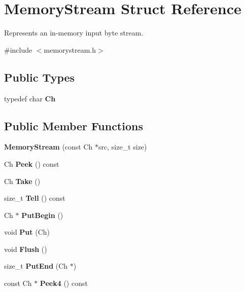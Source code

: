 \hypertarget{a02296}{}\section{Memory\+Stream Struct Reference}
\label{a02296}


Represents an in-\/memory input byte stream.  




{\ttfamily \#include $<$memorystream.\+h$>$}

\subsection*{Public Types}
\begin{DoxyCompactItemize}
\item 
\mbox{\label{a02296_a62a1cbd052c325c83dbdb387d2f89088}} 
typedef char {\bfseries Ch}
\end{DoxyCompactItemize}
\subsection*{Public Member Functions}
\begin{DoxyCompactItemize}
\item 
\mbox{\label{a02296_a2472317ef00fcd44e5cc209e04c49756}} 
{\bfseries Memory\+Stream} (const Ch $\ast$src, size\+\_\+t size)
\item 
\mbox{\label{a02296_a707014bbfd303838b6a7b90be24f6adc}} 
Ch {\bfseries Peek} () const
\item 
\mbox{\label{a02296_a14ff92deda5d39c9b166aaa07e82a0ee}} 
Ch {\bfseries Take} ()
\item 
\mbox{\label{a02296_a2de1486742f0d44decda90a56bc43268}} 
size\+\_\+t {\bfseries Tell} () const
\item 
\mbox{\label{a02296_a5674d10aa2faa05cb326e2e16715cc3d}} 
Ch $\ast$ {\bfseries Put\+Begin} ()
\item 
\mbox{\label{a02296_ac445f93c23c9e85f1f5381911c4ed870}} 
void {\bfseries Put} (Ch)
\item 
\mbox{\label{a02296_a305e141314ae0e3afacb04aaf2d8bcc6}} 
void {\bfseries Flush} ()
\item 
\mbox{\label{a02296_a74fb36c1f6f95d189502cf7a6be79135}} 
size\+\_\+t {\bfseries Put\+End} (Ch $\ast$)
\item 
\mbox{\label{a02296_ac63422050829d9724086363247059089}} 
const Ch $\ast$ {\bfseries Peek4} () const
\end{DoxyCompactItemize}
